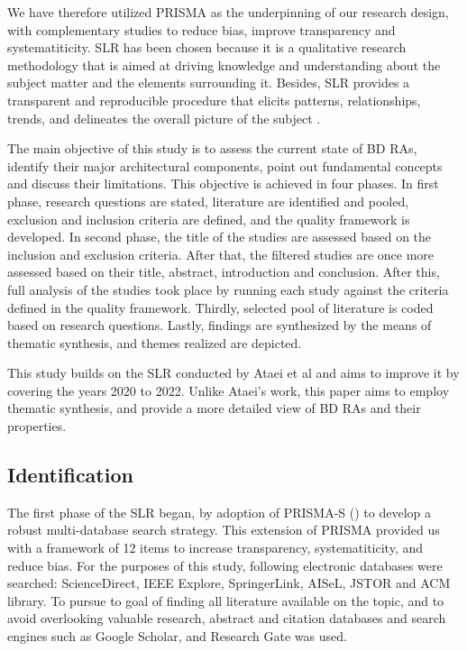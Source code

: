 \documentclass{ieeeaccess}
\begin{document}
We have therefore utilized PRISMA as the underpinning of our research design, with complementary studies to reduce bias, improve transparency and systematiticity. SLR has been chosen because it is a qualitative research methodology that is aimed at driving knowledge and understanding about the subject matter and the elements surrounding it. Besides, SLR provides a transparent and reproducible procedure that elicits patterns, relationships, trends, and delineates the overall picture of the subject \cite{borrego2014systematic}.

The main objective of this study is to assess the current state of BD RAs, identify their major architectural components, point out fundamental concepts and discuss their limitations. This objective is achieved in four phases. In first phase, research questions are stated, literature are identified and pooled, exclusion and inclusion criteria are defined, and the quality framework is developed. In second phase, the title of the studies are assessed based on the inclusion and exclusion criteria. After that, the filtered studies are once more assessed based on their title, abstract, introduction and conclusion. After this, full analysis of the studies took place by running each study against the criteria defined in the quality framework. Thirdly, selected pool of literature is coded based on research questions. Lastly, findings are synthesized by the means of thematic synthesis, and themes realized are depicted.

This study builds on the SLR conducted by Ataei et al \cite{AtaeiACIS} and aims to improve it by covering the years 2020 to 2022. Unlike Ataei's work, this paper aims to employ thematic synthesis, and provide a more detailed view of BD RAs and their properties.

\subsection{Identification}

The first phase of the SLR began, by adoption of PRISMA-S (\cite{rethlefsen2021prisma}) to develop a robust multi-database search strategy. This extension of PRISMA provided us with a framework of 12 items to increase transparency, systematiticity, and reduce bias. For the purposes of this study, following electronic databases were searched: ScienceDirect, IEEE Explore, SpringerLink, AISeL, JSTOR and ACM library. To pursue to goal of finding all literature available on the topic, and to avoid overlooking valuable research, abstract and citation databases and search engines such as Google Scholar, and Research Gate was used.
\end{document}
